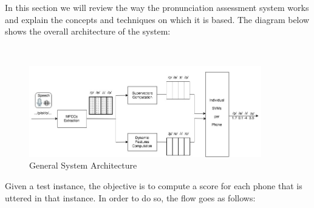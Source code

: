 In this section we will review the way the pronunciation assessment system works
and explain the concepts and techniques on which it is based. The diagram below
shows the overall architecture of the system:

~

\begin{figure}[H]
	\centering
	\includegraphics[width=0.9\textwidth]{files/figures/method/general-structure-v2.jpg}
	\caption{General System Architecture}
	\label{fig:methodGeneralArchitecture}
\end{figure}

Given a test instance, the objective is to compute a score for each phone that
is uttered in that instance. In order to do so, the flow goes as follows:

